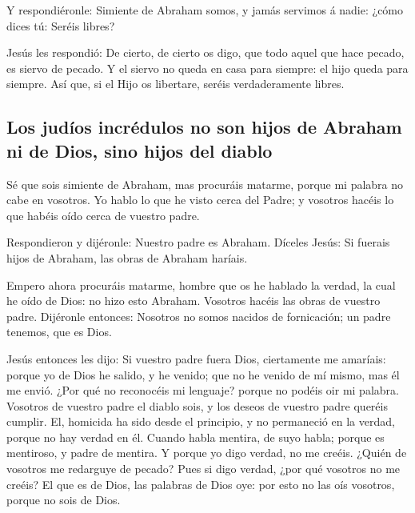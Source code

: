  Y respondiéronle: Simiente de Abraham somos, y jamás
servimos á nadie: ¿cómo dices tú: Seréis libres?

 Jesús les respondió: De cierto, de cierto os digo, que
todo aquel que hace pecado, es siervo de pecado.  Y el
siervo no queda en casa para siempre: el hijo queda para siempre.
 Así que, si el Hijo os libertare, seréis verdaderamente
libres.

\hypertarget{los-juduxedos-incruxe9dulos-no-son-hijos-de-abraham-ni-de-dios-sino-hijos-del-diablo}{%
\subsection{Los judíos incrédulos no son hijos de Abraham ni de Dios,
sino hijos del
diablo}\label{los-juduxedos-incruxe9dulos-no-son-hijos-de-abraham-ni-de-dios-sino-hijos-del-diablo}}

 Sé que sois simiente de Abraham, mas procuráis matarme,
porque mi palabra no cabe en vosotros.  Yo hablo lo que
he visto cerca del Padre; y vosotros hacéis lo que habéis oído cerca de
vuestro padre.

 Respondieron y dijéronle: Nuestro padre es Abraham.
Díceles Jesús: Si fuerais hijos de Abraham, las obras de Abraham
haríais.

 Empero ahora procuráis matarme, hombre que os he hablado
la verdad, la cual he oído de Dios: no hizo esto Abraham.
 Vosotros hacéis las obras de vuestro padre. Dijéronle
entonces: Nosotros no somos nacidos de fornicación; un padre tenemos,
que es Dios.

 Jesús entonces les dijo: Si vuestro padre fuera Dios,
ciertamente me amaríais: porque yo de Dios he salido, y he venido; que
no he venido de mí mismo, mas él me envió.  ¿Por qué no
reconocéis mi lenguaje? porque no podéis oir mi palabra. 
Vosotros de vuestro padre el diablo sois, y los deseos de vuestro padre
queréis cumplir. El, homicida ha sido desde el principio, y no
permaneció en la verdad, porque no hay verdad en él. Cuando habla
mentira, de suyo habla; porque es mentiroso, y padre de mentira.
 Y porque yo digo verdad, no me creéis. 
¿Quién de vosotros me redarguye de pecado? Pues si digo verdad, ¿por qué
vosotros no me creéis?  El que es de Dios, las palabras
de Dios oye: por esto no las oís vosotros, porque no sois de Dios.

